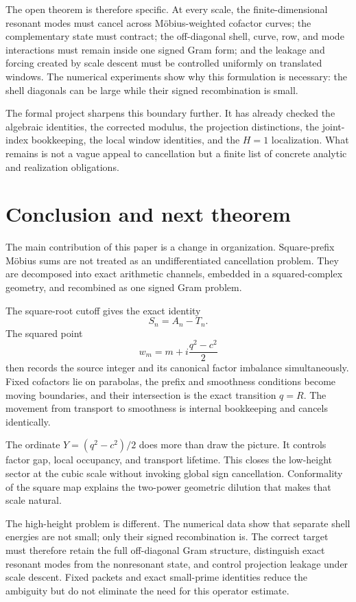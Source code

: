 \documentclass[11pt]{article}
\theoremstyle{definition}
\theoremstyle{remark}
\newcommand{\1}{\mathbf{1}}
\begin{document}
The open theorem is therefore specific.  At every scale, the finite-dimensional resonant modes must cancel across M\"obius-weighted cofactor curves; the complementary state must contract; the off-diagonal shell, curve, row, and mode interactions must remain inside one signed Gram form; and the leakage and forcing created by scale descent must be controlled uniformly on translated windows.  The numerical experiments show why this formulation is necessary: the shell diagonals can be large while their signed recombination is small.

The formal project sharpens this boundary further.  It has already checked the algebraic identities, the corrected modulus, the projection distinctions, the joint-index bookkeeping, the local window identities, and the $H=1$ localization.  What remains is not a vague appeal to cancellation but a finite list of concrete analytic and realization obligations.

\section{Conclusion and next theorem}
\label{sec:conclusion}

The main contribution of this paper is a change in organization.  Square-prefix M\"obius sums are not treated as an undifferentiated cancellation problem.  They are decomposed into exact arithmetic channels, embedded in a squared-complex geometry, and recombined as one signed Gram problem.

The square-root cutoff gives the exact identity
\[
 S_n=A_n-T_n.
\]
The squared point
\[
 w_m=m+i\frac{q^2-c^2}{2}
\]
then records the source integer and its canonical factor imbalance simultaneously.  Fixed cofactors lie on parabolas, the prefix and smoothness conditions become moving boundaries, and their intersection is the exact transition $q=R$.  The movement from transport to smoothness is internal bookkeeping and cancels identically.

The ordinate $Y=(q^2-c^2)/2$ does more than draw the picture.  It controls factor gap, local occupancy, and transport lifetime.  This closes the low-height sector at the cubic scale without invoking global sign cancellation.  Conformality of the square map explains the two-power geometric dilution that makes that scale natural.

The high-height problem is different.  The numerical data show that separate shell energies are not small; only their signed recombination is.  The correct target must therefore retain the full off-diagonal Gram structure, distinguish exact resonant modes from the nonresonant state, and control projection leakage under scale descent.  Fixed packets and exact small-prime identities reduce the ambiguity but do not eliminate the need for this operator estimate.
\end{document}

